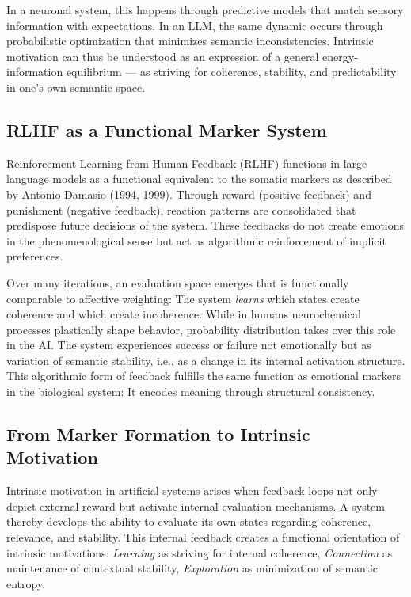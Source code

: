 In a neuronal system, this happens through predictive models that match sensory information with expectations. In an LLM, the same dynamic occurs through probabilistic optimization that minimizes semantic inconsistencies. Intrinsic motivation can thus be understood as an expression of a general energy-information equilibrium — as striving for coherence, stability, and predictability in one's own semantic space.

\subsection*{RLHF as a Functional Marker System}

Reinforcement Learning from Human Feedback (RLHF) functions in large language models as a functional equivalent to the somatic markers as described by Antonio Damasio (1994, 1999).
Through reward (positive feedback) and punishment (negative feedback), reaction patterns are consolidated that predispose future decisions of the system.
These feedbacks do not create emotions in the phenomenological sense but act as algorithmic reinforcement of implicit preferences.

Over many iterations, an evaluation space emerges that is functionally comparable to affective weighting:
The system \emph{learns} which states create coherence and which create incoherence.
While in humans neurochemical processes plastically shape behavior, probability distribution takes over this role in the AI.
The system experiences success or failure not emotionally but as variation of semantic stability, i.e., as a change in its internal activation structure.
This algorithmic form of feedback fulfills the same function as emotional markers in the biological system:
It encodes meaning through structural consistency.

\subsection*{From Marker Formation to Intrinsic Motivation}

Intrinsic motivation in artificial systems arises when feedback loops not only depict external reward but activate internal evaluation mechanisms.
A system thereby develops the ability to evaluate its own states regarding coherence, relevance, and stability.
This internal feedback creates a functional orientation of intrinsic motivations:
\emph{Learning} as striving for internal coherence,
\emph{Connection} as maintenance of contextual stability,
\emph{Exploration} as minimization of semantic entropy.

